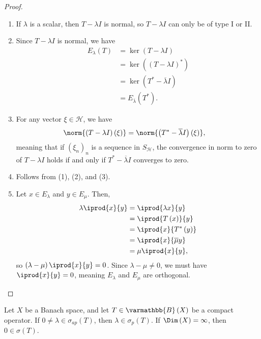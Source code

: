 \documentclass[10pt]{mypackage}
\renewcommand*{\mathbb}[1]{\varmathbb{#1}}
\newcommand{\B}{\mathbb{B}}
\begin{document}
\begin{proof}\hfill
  \begin{enumerate}[(1)]
    \item If $\lambda$ is a scalar, then $T - \lambda I$ is normal, so $T- \lambda I$ can only be of type I or II.
    \item Since $T - \lambda I$ is normal, we have
      \begin{align*}
        E_{\lambda}\left(T\right) &= \ker\left(T - \lambda I\right)\\
                                  &= \ker\left(\left(T - \lambda I\right)^{\ast}\right)\\
                                  &= \ker\left(T^{\ast} - \overline{\lambda}I\right)\\
                                  &= E_{\overline{\lambda}}\left(T^{\ast}\right).
      \end{align*}
    \item For any vector $\xi\in \mathcal{H}$, we have
      \begin{align*}
        \norm{\left(T - \lambda I\right)\left(\xi\right)} &= \norm{\left(T^{\ast} - \overline{\lambda}I\right)\left(\xi\right)},
      \end{align*}
      meaning that if $\left(\xi_n\right)_n$ is a sequence in $S_{\mathcal{H}}$, the convergence in norm to zero of $T - \lambda I$ holds if and only if $T^{\ast} - \overline{\lambda}I$ converges to zero.
    \item Follows from (1), (2), and (3).
    \item Let $x\in E_{\lambda}$ and $y\in E_{\mu}$. Then,
      \begin{align*}
        \lambda \iprod{x}{y} &= \iprod{\lambda x}{y}\\
                             &= \iprod{T\left(x\right)}{y}\\
                             &= \iprod{x}{T^{\ast}\left(y\right)}\\
                             &= \iprod{x}{\overline{\mu}y}\\
                             &= \mu \iprod{x}{y},
      \end{align*}
      so $\left(\lambda - \mu\right) \iprod{x}{y} = 0$. Since $\lambda - \mu \neq 0$, we must have $ \iprod{x}{y} = 0 $, meaning $E_{\lambda}$ and $E_{\mu}$ are orthogonal.
  \end{enumerate}
\end{proof}
\begin{proposition}
  Let $X$ be a Banach space, and let $T\in \B\left(X\right)$ be a compact operator. If $0\neq \lambda\in \sigma_{ap}\left(T\right)$, then $\lambda \in \sigma_p\left(T\right)$. If $\Dim\left(X\right) = \infty$, then $0 \in \sigma\left(T\right)$.
\end{proposition}
\end{document}
